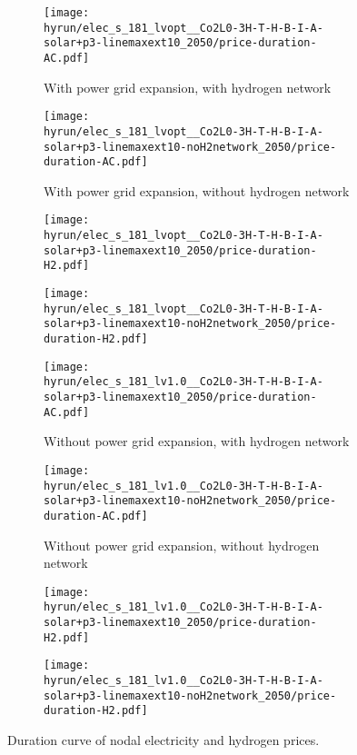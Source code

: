 \begin{figure}
    \begin{subfigure}{0.49\textwidth}
        \centering
        \caption{With power grid expansion, with hydrogen network}
        \texttt{[image: \\hyrun/elec\_s\_181\_lvopt\_\_Co2L0-3H-T-H-B-I-A-solar+p3-linemaxext10\_2050/price-duration-AC.pdf]}
    \end{subfigure}
    \begin{subfigure}{0.49\textwidth}
        \centering
        \caption{With power grid expansion, without hydrogen network}
        \texttt{[image: \\hyrun/elec\_s\_181\_lvopt\_\_Co2L0-3H-T-H-B-I-A-solar+p3-linemaxext10-noH2network\_2050/price-duration-AC.pdf]}
    \end{subfigure}
    \begin{subfigure}{0.49\textwidth}
        \centering
        \texttt{[image: \\hyrun/elec\_s\_181\_lvopt\_\_Co2L0-3H-T-H-B-I-A-solar+p3-linemaxext10\_2050/price-duration-H2.pdf]}
    \end{subfigure}
    \begin{subfigure}{0.49\textwidth}
        \centering
        \texttt{[image: \\hyrun/elec\_s\_181\_lvopt\_\_Co2L0-3H-T-H-B-I-A-solar+p3-linemaxext10-noH2network\_2050/price-duration-H2.pdf]}
    \end{subfigure}
    \begin{subfigure}{0.49\textwidth}
        \centering
        \caption{Without power grid expansion, with hydrogen network}
        \texttt{[image: \\hyrun/elec\_s\_181\_lv1.0\_\_Co2L0-3H-T-H-B-I-A-solar+p3-linemaxext10\_2050/price-duration-AC.pdf]}
    \end{subfigure}
    \begin{subfigure}{0.49\textwidth}
        \centering
        \caption{Without power grid expansion, without hydrogen network}
        \texttt{[image: \\hyrun/elec\_s\_181\_lv1.0\_\_Co2L0-3H-T-H-B-I-A-solar+p3-linemaxext10-noH2network\_2050/price-duration-AC.pdf]}
    \end{subfigure}
    \begin{subfigure}{0.49\textwidth}
        \centering
        \texttt{[image: \\hyrun/elec\_s\_181\_lv1.0\_\_Co2L0-3H-T-H-B-I-A-solar+p3-linemaxext10\_2050/price-duration-H2.pdf]}
    \end{subfigure}
    \begin{subfigure}{0.49\textwidth}
        \centering
        \texttt{[image: \\hyrun/elec\_s\_181\_lv1.0\_\_Co2L0-3H-T-H-B-I-A-solar+p3-linemaxext10-noH2network\_2050/price-duration-H2.pdf]}
    \end{subfigure}
    \caption{Duration curve of nodal electricity and hydrogen prices.}
    \label{fig:si:lmp-dc}
\end{figure}


